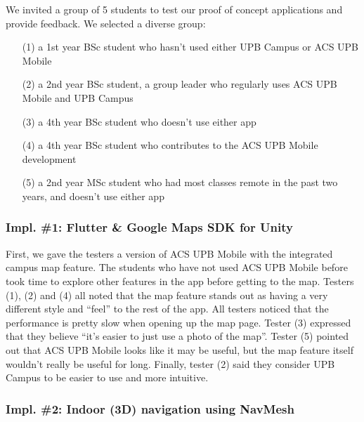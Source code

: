         We invited a group of 5 students to test our proof of concept applications and provide feedback. We selected a diverse group:
        \begin{enumerate}
            \itemsep0em
            \vspace{-0.2cm}\item[(1)] a 1st year BSc student who hasn’t used either UPB Campus or ACS UPB Mobile
            \vspace{-0.2cm}\item[(2)] a 2nd year BSc student, a group leader who regularly uses ACS UPB Mobile and UPB Campus
            \vspace{-0.2cm}\item[(3)] a 4th year BSc student who doesn’t use either app
            \vspace{-0.2cm}\item[(4)] a 4th year BSc student who contributes to the ACS UPB Mobile development
            
            
            \vspace{-0.2cm}\item[(5)] a 2nd year MSc student who had most classes remote in the past two years, and doesn’t use either app
        \end{enumerate}
        
        \subsubsection{Impl. \#1: Flutter \& Google Maps SDK for Unity}
        
            First, we gave the testers a version of ACS UPB Mobile with the integrated campus map feature.
            The students who have not used ACS UPB Mobile before took time to explore other features in the app before getting to the map. Testers (1), (2) and (4) all noted that the map feature stands out as having a very different style and “feel” to the rest of the app. All testers noticed that the performance is pretty slow when opening up the map page. Tester (3) expressed that they believe “it’s easier to just use a photo of the map”. Tester (5) pointed out that ACS UPB Mobile looks like it may be useful, but the map feature itself wouldn’t really be useful for long. Finally, tester (2) said they consider UPB Campus to be easier to use and more intuitive.

        \subsubsection{Impl. \#2: Indoor (3D) navigation using NavMesh}
        
